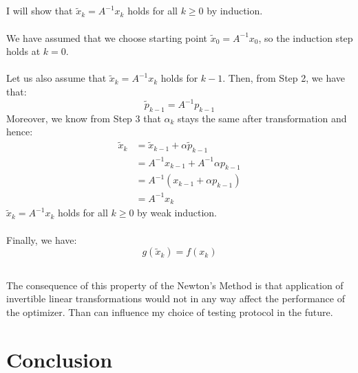 \documentclass[a4paper]{article}
\begin{document}
\subsection{}
I will show that $\tilde{x}_k = A^{-1}x_k$ holds for all
$k\geq 0$ by induction. \\\\
We have assumed that we choose starting point $\tilde{x}_0 = A^{-1}x_0$, so the
induction step holds at $k=0$.\\\\
Let us also assume that $\tilde{x}_k = A^{-1}x_k$ holds for $k-1$. Then, from
Step 2, we have that:
\[
\tilde{p}_{k-1} = A^{-1}p_{k-1}
\]
Moreover, we know from Step 3 that $\alpha_k$ stays the same after
transformation and hence:
\[
\begin{aligned}
  \tilde{x}_{k}
  &= \tilde{x}_{k-1} + \alpha\tilde{p}_{k-1}\\
  &= A^{-1}x_{k-1} + A^{-1}\alpha p_{k-1}\\
  &= A^{-1}(x_{k-1} + \alpha p_{k-1})\\
  &= A^{-1}x_k
\end{aligned}
\]
$\tilde{x}_k = A^{-1}x_k$ holds for all $k\geq 0$ by weak induction.\\\\
Finally, we have:
\[
  g(\tilde{x}_k)= f(x_k)
\]

\subsection{}
The consequence of this property of the Newton's Method is that application of
invertible linear transformations would not in any way affect the performance of
the optimizer. Than can influence my choice of testing protocol in the future.

\section{Conclusion}
\end{document}

